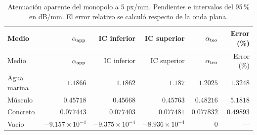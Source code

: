 \begingroup\small\setlength{\tabcolsep}{4pt}
\begin{longtable}{lrrrrr}
\caption{Atenuación aparente del monopolo a 5 px/mm. Pendientes e intervalos del 95\,\% en dB/mm. El error relativo se calculó respecto de la onda plana.}\label{t:principal}\\
\hline Medio & $\alpha_{\rm app}$ & IC inferior & IC superior & $\alpha_{\rm teo}$ & Error (\%) \\ \hline\endfirsthead
\hline Medio & $\alpha_{\rm app}$ & IC inferior & IC superior & $\alpha_{\rm teo}$ & Error (\%) \\ \hline\endhead
Agua marina & $1.1866$ & $1.1862$ & $1.187$ & $1.2025$ & $1.3248$ \\
Músculo & $0.45718$ & $0.45668$ & $0.45763$ & $0.48216$ & $5.1818$ \\
Concreto & $0.077443$ & $0.077403$ & $0.077481$ & $0.077832$ & $0.49893$ \\
Vacío & $-9.157\times 10^{-4}$ & $-9.375\times 10^{-4}$ & $-8.936\times 10^{-4}$ & $0$ & --- \\
\hline\end{longtable}\endgroup
